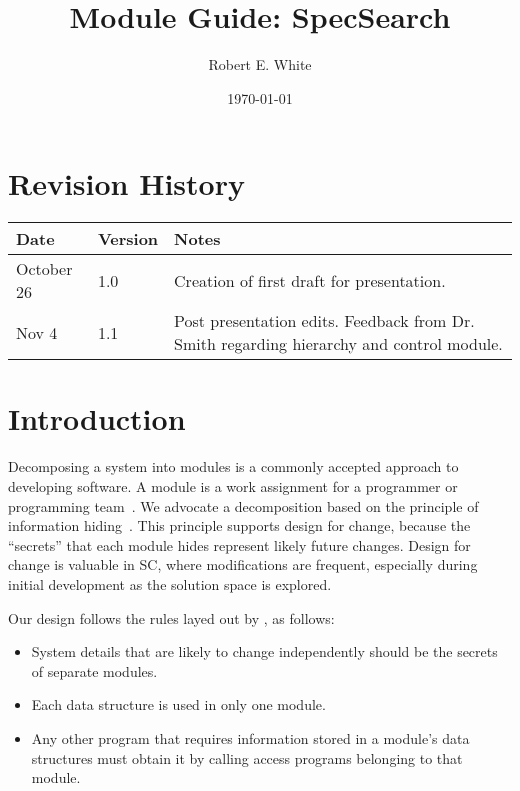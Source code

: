 \documentclass[12pt, titlepage]{article}
\begin{document}
\title{Module Guide: SpecSearch} 
\author{Robert E. White}
\date{\today}

\maketitle
\section{Revision History}

\begin{tabularx}{\textwidth}{p{3cm}p{2cm}X}
\toprule {\bf Date} & {\bf Version} & {\bf Notes}\\
\midrule
October 26 & 1.0 & Creation of first draft for presentation.\\ 
Nov 4 & 1.1 & Post presentation edits. Feedback from Dr. Smith regarding 
hierarchy and control module.\\
\bottomrule
\end{tabularx}

\newpage

\tableofcontents

\listoftables

\listoffigures

\newpage


\section{Introduction}

Decomposing a system into modules is a commonly accepted approach to developing
software.  A module is a work assignment for a programmer or programming
team~\citep{ParnasEtAl1984}.  We advocate a decomposition
based on the principle of information hiding~\citep{Parnas1972a}.  This
principle supports design for change, because the ``secrets'' that each module
hides represent likely future changes.  Design for change is valuable in SC,
where modifications are frequent, especially during initial development as the
solution space is explored.  

Our design follows the rules layed out by \citet{ParnasEtAl1984}, as follows:
\begin{itemize}
\item System details that are likely to change independently should be the
  secrets of separate modules.
\item Each data structure is used in only one module.
\item Any other program that requires information stored in a module's data
  structures must obtain it by calling access programs belonging to that module.
\end{itemize}
\end{document}
